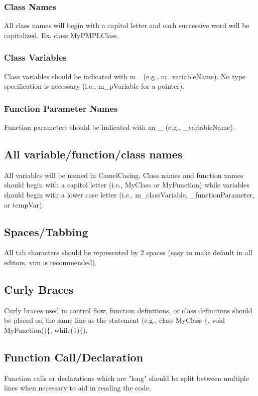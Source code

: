 \documentclass[12pt]{article}
\begin{document}
\subsubsection{Class Names}
All class names will begin with a capitol letter and each successive word will be capitalized. Ex. class MyPMPLClass.

\subsubsection{Class Variables}
Class variables should be indicated with m\_ (e.g., m\_variableName). No type specification is necessary (i.e.,
m\_pVariable for a pointer).

\subsubsection{Function Parameter Names}
Function parameters should be indicated with an \_ (e.g., \_variableName).

\subsection{All variable/function/class names}
All variables will be named in CamelCasing. Class names and function names should begin with a capitol letter (i.e.,
MyClass or MyFunction) while variables should begin with a lower case letter (i.e., m\_classVariable,
\_functionParameter, or tempVar).

\subsection{Spaces/Tabbing}
All tab characters should be represented by 2 spaces (easy to make default in all editors, vim is recommended).

\subsection{Curly Braces}
Curly braces used in control flow, function definitions, or class definitions should be placed on the same line as the
statement (e.g., class MyClass $\{$, void MyFunction()$\{$, while(1)$\{$).

\subsection{Function Call/Declaration}
Function calls or declarations which are "long" should be split between multiple lines when necessary to aid in reading
the code.
\end{document}
